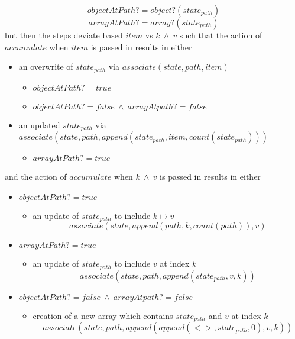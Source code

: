 \documentclass[../main.tex]{subfiles}
\begin{document}
$$objectAtPath? = object?(state_{path})$$
$$arrayAtPath? = array?(state_{path})$$
but then the steps deviate based $item$ vs $k \ \land \ v$ such that the action of $accumulate$ when $item$ is passed in results in either
\begin{itemize}
\item an overwrite of $state_{path}$ via $associate(state, path, item)$
  \begin{itemize}
  \item $objectAtPath? = true$
  \item $objectAtPath? = false \ \land \ arrayAtpath? = false$
  \end{itemize}
\item an updated $state_{path}$ via $associate(state, path, append(state_{path}, item, count(state_{path})))$
  \begin{itemize}
  \item $arrayAtPath? = true$
  \end{itemize}
\end{itemize}
and the action of $accumulate$ when $k \ \land \ v$ is passed in results in either
\begin{itemize}
\item $objectAtPath? = true$
  \begin{itemize}
  \item an update of $state_{path}$ to include $k \mapsto v$
    $$associate(state, append(path, k, count(path)), v)$$
  \end{itemize}
\item $arrayAtPath? = true$
  \begin{itemize}
  \item an update of $state_{path}$ to include $v$ at index $k$
    $$associate(state, path, append(state_{path}, v, k))$$
  \end{itemize}
\item $objectAtPath? = false \ \land \ arrayAtpath? = false$
  \begin{itemize}
  \item creation of a new array which contains $state_{path}$ and $v$ at index $k$
    $$associate(state, path, append(append(<>, state_{path}, 0), v, k))$$
  \end{itemize}
\end{itemize}
\end{document}
